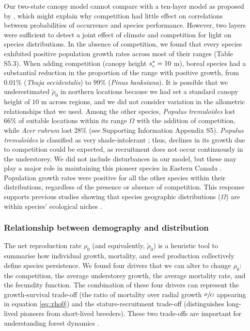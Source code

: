 Our two-state canopy model cannot compare with a ten-layer model as proposed by \citet{Lischke1998}, which might explain why competition had little effect on correlations between probabilities of occurrence and species performance. However, two layers were sufficient to detect a joint effect of climate and competition for light on species distributions. In the absence of competition, we found that every species exhibited positive population growth rates across most of their ranges (Table S5.3). When adding competition (canopy height $ {s}^{*}_c = 10 $ m), boreal species had a substantial reduction in the proportion of the range with positive growth, from $ 0.01 \% $ (\textit{Thuja occidentalis}) to $ 99 \% $ (\textit{Pinus banksiana}). It is possible that we underestimated $ \tilde \rho_0 $ in northern locations because we had set a standard canopy height of $ 10 $ m across regions, and we did not consider variation in the allometric relationships that we used. Among the other species, \textit{Populus tremuloides} lost $ 66 \% $ of suitable locations within its range $ \Omega $ with the addition of competition, while \textit{Acer rubrum} lost $ 28 \% $ (see Supporting Information Appendix S5). \textit{Populus tremuloides} is classified as very shade-intolerant \citep{Burns1990a}; thus, declines in its growth due to competition could be expected, as recruitment does not occur continuously in the understorey. We did not include disturbances in our model, but these may play a major role in maintaining this pioneer species in Eastern Canada \citep{Nlungu-Kweta2017}. Population growth rates were positive for all the other species within their distributions, regardless of the presence or absence of competition. This response supports previous studies showing that species geographic distributions ($ \Omega $) are within species' ecological niches \citep{Lee-Yaw2016, Csergo2017}.

\subsubsection{Relationship between demography and distribution}
The net reproduction rate $ \rho_0 $ (and equivalently, $ \tilde \rho_0 $) is a heuristic tool to summarise how individual growth, mortality, and seed production collectively define species persistence. We found four drivers that we can alter to change $ \rho_0 $: the competition, the average understorey growth, the average mortality rate, and the fecundity function. The combination of these four drivers can represent the growth-survival trade-off (\eg the ratio of mortality over radial growth $ \sfrac{\mu}{G} $ appearing in equation \eqref{eq::rho0}) and the stature-recruitment trade-off (distinguishes long-lived pioneers from short-lived breeders). These two trade-offs are important for understanding forest dynamics \citep[for tropical forest]{Ruger2020}. \\

